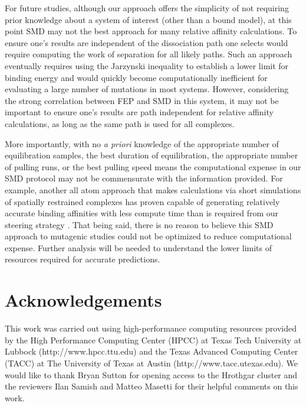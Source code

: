 \documentclass[12pt]{article}
\begin{document}
For future studies, although our approach offers the simplicity of not requiring prior knowledge about a system of interest (other than a bound model), at this point SMD may not the best approach for many relative affinity calculations. To ensure one's results are independent of the dissociation path one selects would require computing the work of separation for all likely paths. Such an approach eventually requires using the Jarzynski inequality \citep{Jar1997} to establish a lower limit for binding energy and would quickly become computationally inefficient for evaluating a large number of mutations in most systems. However, considering the strong correlation between FEP and SMD in this system, it may not be important to ensure one's results are path independent for relative affinity calculations, as long as the same path is used for all complexes.

More importantly, with no \textit{a priori} knowledge of the appropriate number of equilibration samples, the best duration of equilibration, the appropriate number of pulling runs, or the best pulling speed means the computational expense in our SMD protocol may not be commensurate with the information provided. For example, another all atom approach that makes calculations via short simulations of spatially restrained complexes has proven capable of generating relatively accurate binding affinities with less compute time than is required from our steering strategy \citep{Gumbart2013,Gumbart2013b}. That being said, there is no reason to believe this SMD approach to mutagenic studies could not be optimized to reduce computational expense. Further analysis will be needed to understand the lower limits of resources required for accurate predictions.

\section{Acknowledgements}
This work was carried out using high-performance computing resources provided by the High Performance Computing Center (HPCC) at Texas Tech University at Lubbock (http://www.hpcc.ttu.edu) and the Texas Advanced Computing Center (TACC) at The University of Texas at Austin (http://www.tacc.utexas.edu). We would like to thank Bryan Sutton for opening access to the Hrothgar cluster and the reviewers Ilan Samish and Matteo Masetti for their helpful comments on this work.



\end{document}
